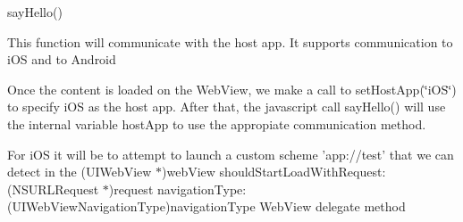 \begin{DoxyItemize}
\item say\-Hello()
\end{DoxyItemize}

This function will communicate with the host app. It supports communication to i\-O\-S and to Android

Once the content is loaded on the Web\-View, we make a call to set\-Host\-App(\char`\"{}i\-O\-S\char`\"{}) to specify i\-O\-S as the host app. After that, the javascript call say\-Hello() will use the internal variable host\-App to use the appropiate communication method.

For i\-O\-S it will be to attempt to launch a custom scheme 'app\-://test' that we can detect in the (U\-I\-Web\-View $\ast$)web\-View should\-Start\-Load\-With\-Request\-:(\-N\-S\-U\-R\-L\-Request $\ast$)request navigation\-Type\-:(\-U\-I\-Web\-View\-Navigation\-Type)navigation\-Type Web\-View delegate method 